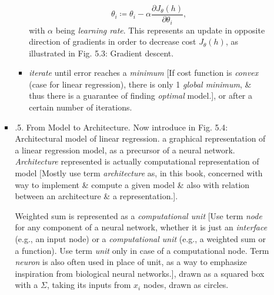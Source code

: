 \documentclass{article}
\begin{document}
\begin{itemize}
\begin{itemize}
\begin{itemize}
\begin{itemize}
				\begin{equation*}
					\theta_i\coloneqq\theta_i - \alpha\frac{\partial J_\theta(h)}{\partial\theta_i},
				\end{equation*}
				with $\alpha$ being {\it learning rate}. This represents an update in opposite direction of gradients in order to decrease cost $J_\theta(h)$, as illustrated in {\sf Fig. 5.3: Gradient descent.}
				\item {\it iterate} until error reaches a {\it minimum} [If cost function is {\it convex} (case for linear regression), there is only 1 {\it global minimum}, \& thus there is a guarantee of finding {\it optimal} model.], or after a certain number of iterations.
			\end{itemize}
			\item {.5. From Model to Architecture.} Now introduce in {\sf Fig. 5.4: Architectural model of linear regression.} a graphical representation of a linear regression model, as a precursor of a neural network. {\it Architecture} represented is actually computational representation of model [Mostly use term {\it architecture} as, in this book, concerned with way to implement \& compute a given model \& also with relation between an architecture \& a representation.].
			
			Weighted sum is represented as a {\it computational unit} [Use term {\it node} for any component of a neural network, whether it is just an {\it interface} (e.g., an input node) or a {\it computational unit} (e.g., a weighted sum or a function). Use term {\it unit} only in case of a computational node. Term {\it neuron} is also often used in place of unit, as a way to emphasize inspiration from biological neural networks.], drawn as a squared box with a $\Sigma$, taking its inputs from $x_i$ nodes, drawn as circles.
			

\end{itemize}
\end{itemize}
\end{itemize}
\end{document}
